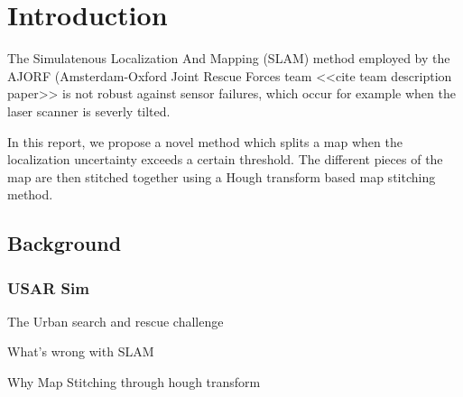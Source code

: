 \chapter{Introduction}
\label{chapter:introduction}
The Simulatenous Localization And Mapping (SLAM) method employed by the AJORF (Amsterdam-Oxford Joint Rescue Forces team <<cite team description paper>> is not robust against sensor failures, which occur for example when the laser scanner is severly tilted. 

In this report, we propose a novel method which splits a map when the localization uncertainty exceeds a certain threshold. The different pieces of the map are then stitched together using a Hough transform based map stitching method.

\section{Background}
\subsection{USAR Sim}
The Urban search and rescue challenge

What's wrong with SLAM

Why Map Stitching through hough transform


